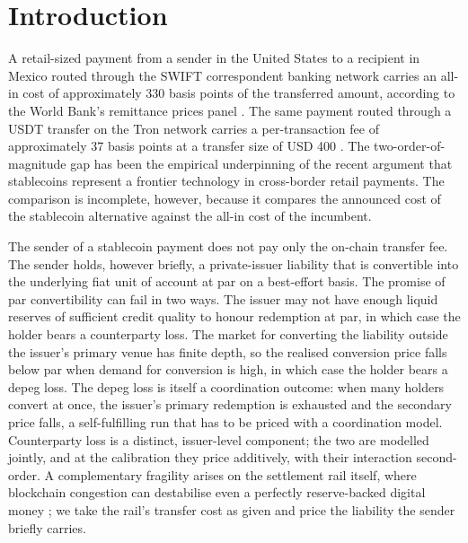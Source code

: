 \section{Introduction}\label{sec:introduction}

A retail-sized payment from a sender in the United States to a recipient in Mexico routed through the SWIFT correspondent banking network carries an all-in cost of approximately 330 basis points of the transferred amount, according to the World Bank's remittance prices panel \citep{rpw_q3_2025}. The same payment routed through a USDT transfer on the Tron network carries a per-transaction fee of approximately 37 basis points at a transfer size of USD 400 \citep{tronsave_blog_2026}. The two-order-of-magnitude gap has been the empirical underpinning of the recent argument that stablecoins represent a frontier technology in cross-border retail payments. The comparison is incomplete, however, because it compares the announced cost of the stablecoin alternative against the all-in cost of the incumbent.

The sender of a stablecoin payment does not pay only the on-chain transfer fee. The sender holds, however briefly, a private-issuer liability that is convertible into the underlying fiat unit of account at par on a best-effort basis. The promise of par convertibility can fail in two ways. The issuer may not have enough liquid reserves of sufficient credit quality to honour redemption at par, in which case the holder bears a counterparty loss. The market for converting the liability outside the issuer's primary venue has finite depth, so the realised conversion price falls below par when demand for conversion is high, in which case the holder bears a depeg loss. The depeg loss is itself a coordination outcome: when many holders convert at once, the issuer's primary redemption is exhausted and the secondary price falls, a self-fulfilling run that has to be priced with a coordination model. Counterparty loss is a distinct, issuer-level component; the two are modelled jointly, and at the calibration they price additively, with their interaction second-order. A complementary fragility arises on the settlement rail itself, where blockchain congestion can destabilise even a perfectly reserve-backed digital money \citep{klee_etal_2026_fragility}; we take the rail's transfer cost as given and price the liability the sender briefly carries.

